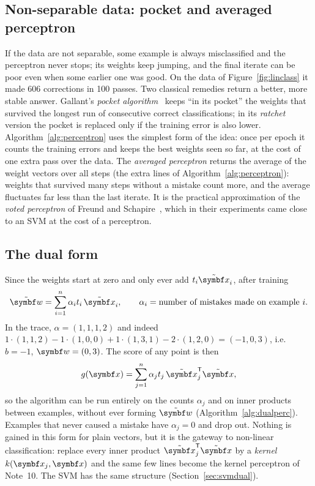 \documentclass[11pt]{article}
\newcommand{\w}{\vect{w}}
\newcommand{\xt}{\tilde{\x}}
\newcommand{\wt}{\tilde{\w}}
\begin{document}
\subsection{Non-separable data: pocket and averaged perceptron}\label{sec:avgperc}

If the data are not separable, some example is always misclassified and the perceptron never stops; its weights keep
jumping, and the final iterate can be poor even when some earlier one was good. On the data of Figure~\ref{fig:linclass} it
made 606 corrections in 100 passes. Two classical remedies return a better, more stable answer. Gallant's \emph{pocket
algorithm}~\cite{gallant1990} keeps ``in its pocket'' the weights that survived the longest run of consecutive correct
classifications; in its \emph{ratchet} version the pocket is replaced only if the training error is also lower.
Algorithm~\ref{alg:perceptron} uses the simplest form of the idea: once per epoch it counts the training errors and keeps
the best weights seen so far, at the cost of one extra pass over the data. The \emph{averaged perceptron} returns the
average of the weight vectors over all steps (the extra lines of Algorithm~\ref{alg:perceptron}): weights that survived
many steps without a mistake count more, and the average fluctuates far less than the last iterate. It is the practical
approximation of the \emph{voted perceptron} of Freund and Schapire~\cite{freund1999}, which in their experiments came
close to an SVM at the cost of a perceptron.

\subsection{The dual form}\label{sec:dualperc}

Since the weights start at zero and only ever add $t_i\xt_i$, after training
\begin{equation}\label{eq:dualw}
  \wt = \sum_{i=1}^n \alpha_i t_i\,\xt_i , \qquad \alpha_i = \text{number of mistakes made on example } i .
\end{equation}
In the trace, $\alpha = (1, 1, 1, 2)$ and indeed $1\cdot(1, 1, 2) - 1\cdot(1, 0, 0) + 1\cdot(1, 3, 1) - 2\cdot(1, 2, 0) =
(-1, 0, 3)$, i.e.\ $b = -1$, $\w = (0, 3)$. The score of any point is then
\[
  g(\x) = \sum_{j=1}^n \alpha_j t_j\, \xt_j\T\xt ,
\]
so the algorithm can be run entirely on the counts $\alpha_j$ and on inner products between examples, without ever
forming $\wt$ (Algorithm~\ref{alg:dualperc}). Examples that never caused a mistake have $\alpha_j = 0$ and drop out. Nothing
is gained in this form for plain vectors, but it is the gateway to non-linear classification: replace every inner product
$\xt_j\T\xt$ by a \emph{kernel} $k(\x_j, \x)$ and the same few lines become the kernel perceptron of Note~10. The SVM has
the same structure (Section~\ref{sec:svmdual}).
\end{document}
